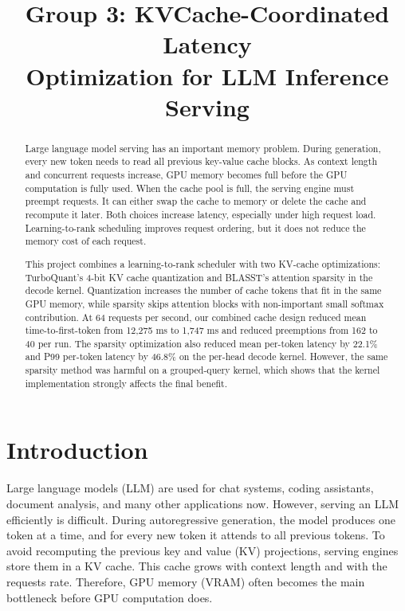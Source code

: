 \documentclass[conference]{IEEEtran}
\begin{document}
\title{Group 3: KVCache-Coordinated Latency\\ Optimization for LLM Inference Serving}

\author{%
}

\maketitle

\begin{abstract}
Large language model serving has an important memory problem. During generation, every new token needs to read all previous key-value cache blocks. As context length and concurrent requests increase, GPU memory becomes full before the GPU computation is fully used. When the cache pool is full, the serving engine must preempt requests. It can either swap the cache to memory or delete the cache and recompute it later. Both choices increase latency, especially under high request load. Learning-to-rank scheduling improves request ordering, but it does not reduce the memory cost of each request.

This project combines a learning-to-rank scheduler with two KV-cache optimizations: TurboQuant's 4-bit KV cache quantization and BLASST's attention sparsity in the decode kernel. Quantization increases the number of cache tokens that fit in the same GPU memory, while sparsity skips attention blocks with non-important small softmax contribution. At 64 requests per second, our combined cache design reduced mean time-to-first-token from 12,275 ms to 1,747 ms and reduced preemptions from 162 to 40 per run. The sparsity optimization also reduced mean per-token latency by 22.1\% and P99 per-token latency by 46.8\% on the per-head decode kernel. However, the same sparsity method was harmful on a grouped-query kernel, which shows that the kernel implementation strongly affects the final benefit.
\end{abstract}

\clearpage
\section{Introduction}

Large language models (LLM) are used for chat systems, coding assistants, document analysis, and many other applications now. However, serving an LLM efficiently is difficult. During autoregressive generation, the model produces one token at a time, and for every new token it attends to all previous tokens. To avoid recomputing the previous key and value (KV) projections, serving engines store them in a KV cache. This cache grows with context length and with the requests rate. Therefore, GPU memory (VRAM) often becomes the main bottleneck before GPU computation does.
\end{document}
